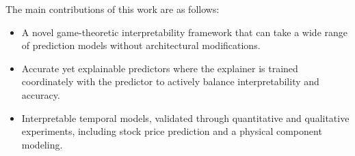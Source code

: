The main contributions of this work are as follows:
\begin{itemize}
	\vspace{-2mm}
	\itemsep0em
	\item A novel game-theoretic interpretability framework that can take a wide range of prediction models without architectural modifications.
    \item Accurate yet explainable predictors where the explainer is trained coordinately with the predictor to actively balance interpretability and accuracy.  
    \item Interpretable temporal models, validated through quantitative and qualitative experiments, including stock price prediction and a physical component modeling. 
\end{itemize}

\iffalse
Our main contribution is to establish a game-theoretic characterization of interpretability. 
The formulation only assumes the target model and the axiomatic set of interpretable models are trainable.
With the progression of the cooperative game, the functional behavior the target function is biased toward interpretable models.
The characterization also admits quantitative evaluation of predictive models. 
\fi